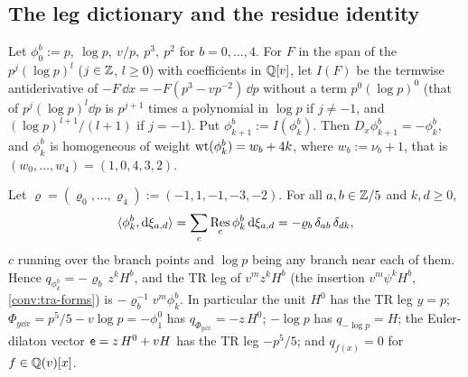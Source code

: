\subsection{The leg dictionary and the residue identity}
\label{sec:mod-legs}

\begin{defn}
\label{def:mod-legs}
Let $\phi^b_0:=p,\ \log p,\ v/p,\ p^3,\ p^2$ for $b=0,\dots,4$. For $F$ in the span of the $p^j(\log p)^l$ ($j\in\mathbb{Z}$, $l\geq 0$) with coefficients in $\mathbb{Q}[v]$, let $I(F)$ be the termwise antiderivative of $-F\,\dd x=-F(p^3-vp^{-2})\,\dd p$ without a term $p^0(\log p)^0$ (that of $p^j(\log p)^l\dd p$ is $p^{j+1}$ times a polynomial in $\log p$ if $j\neq -1$, and $(\log p)^{l+1}/(l+1)$ if $j=-1$). Put $\phi^b_{k+1}:=I(\phi^b_k)$. Then $D_x\phi^b_{k+1}=-\phi^b_k$, and $\phi^b_k$ is homogeneous of weight $\operatorname{wt}(\phi^b_k)=w_b+4k$, where $w_b:=\nu_b+1$, that is $(w_0,\dots,w_4)=(1,0,4,3,2)$.
\end{defn}

\begin{prop}
\label{prop:mod-LD}
Let $\varrho=(\varrho_0,\dots,\varrho_4):=(-1,1,-1,-3,-2)$. For all $a,b\in\mathbb{Z}/5$ and $k,d\geq 0$,
\begin{equation}
\label{eq:mod-LD}
\langle\phi^b_k,\mathrm{d}\xi_{a,d}\rangle=\sum_c\operatorname*{Res}_{c}\phi^b_k\,\mathrm{d}\xi_{a,d}=-\varrho_b\,\delta_{ab}\,\delta_{dk},
\end{equation}
$c$ running over the branch points and $\log p$ being any branch near each of them. Hence $q_{\phi^b_k}=-\varrho_b\,z^kH^b$, and the TR leg of $v^mz^kH^b$ (the insertion $v^m\psi^kH^b$, \cref{conv:tra-forms}) is $-\varrho_b^{-1}v^m\phi^b_k$. In particular the unit $H^0$ has the TR leg $y=p$; $\Phi_{y\dd x}=p^5/5-v\log p=-\phi^0_1$ has $q_{\Phi_{y\dd x}}=-z\,H^0$; $-\log p$ has $q_{-\log p}=H$; the Euler-dilaton vector $\mathsf{e}=z\,H^0+vH$ has the TR leg $-p^5/5$; and $q_{f(x)}=0$ for $f\in\mathbb{Q}(v)[x]$.
\end{prop}

